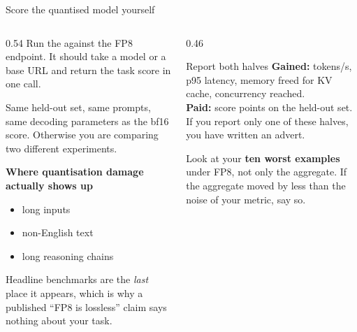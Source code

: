 \documentclass[aspectratio=169,10pt]{beamer}
\begin{document}
\fi
\begin{frame}[shrink=14]{Score the quantised model yourself}
  \begin{columns}[T]
    \begin{column}{0.54\textwidth}
      Run the  against the FP8
      endpoint. It should take a model or a base URL and return the task score
      in one call.
      \vspace{0.4em}

      Same held-out set, same prompts, same decoding parameters as the bf16
      score. Otherwise you are comparing two different experiments.
      \vspace{0.6em}

      \textbf{Where quantisation damage actually shows up}
      \begin{itemize}
        \item long inputs
        \item non-English text
        \item long reasoning chains
      \end{itemize}
      \vspace{0.2em}
      \small
      Headline benchmarks are the \emph{last} place it appears, which is why a
      published ``FP8 is lossless'' claim says nothing about your task.
    \end{column}
    \begin{column}{0.46\textwidth}
      \begin{block}{Report both halves}
        \small
        \textbf{Gained:} tokens/s, p95 latency, memory freed for KV cache,
        concurrency reached.\\[0.4em]
        \textbf{Paid:} score points on the held-out set.\\[0.4em]
        If you report only one of these halves, you have written an advert.
      \end{block}
      \vspace{0.4em}
      \small
      Look at your \textbf{ten worst examples} under FP8, not only the
      aggregate. If the aggregate moved by less than the noise of your metric,
      say so.
    \end{column}
  \end{columns}
\end{frame}
\end{document}
